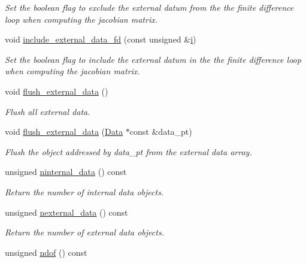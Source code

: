 \begin{DoxyCompactItemize}
\begin{DoxyCompactList}\small\item\em Set the boolean flag to exclude the external datum from the the finite difference loop when computing the jacobian matrix. \end{DoxyCompactList}\item 
void \hyperlink{classoomph_1_1GeneralisedElement_ac65bd63d3959f613a845cdbaff0420de}{include\+\_\+external\+\_\+data\+\_\+fd} (const unsigned \&\hyperlink{cfortran_8h_adb50e893b86b3e55e751a42eab3cba82}{i})
\begin{DoxyCompactList}\small\item\em Set the boolean flag to include the external datum in the the finite difference loop when computing the jacobian matrix. \end{DoxyCompactList}\item 
void \hyperlink{classoomph_1_1GeneralisedElement_aea4a43b909489688ecaf21c4c619fff1}{flush\+\_\+external\+\_\+data} ()
\begin{DoxyCompactList}\small\item\em Flush all external data. \end{DoxyCompactList}\item 
void \hyperlink{classoomph_1_1GeneralisedElement_ada93272e25778609ac991fc3b6d664e1}{flush\+\_\+external\+\_\+data} (\hyperlink{classoomph_1_1Data}{Data} $\ast$const \&data\+\_\+pt)
\begin{DoxyCompactList}\small\item\em Flush the object addressed by data\+\_\+pt from the external data array. \end{DoxyCompactList}\item 
unsigned \hyperlink{classoomph_1_1GeneralisedElement_a6b736de0af4c92831968636479b3480e}{ninternal\+\_\+data} () const
\begin{DoxyCompactList}\small\item\em Return the number of internal data objects. \end{DoxyCompactList}\item 
unsigned \hyperlink{classoomph_1_1GeneralisedElement_a01ff34b3ace7455df74ad77fc86beb71}{nexternal\+\_\+data} () const
\begin{DoxyCompactList}\small\item\em Return the number of external data objects. \end{DoxyCompactList}\item 
unsigned \hyperlink{classoomph_1_1GeneralisedElement_a37204f67b37d212fd170c68d48f6da57}{ndof} () const

\end{DoxyCompactItemize}
